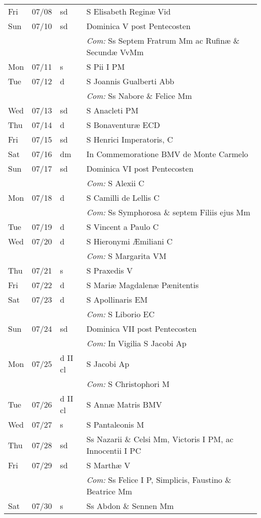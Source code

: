 \documentclass[10pt]{article}
\begin{document}
\begin{longtable}{ l l l l }
Fri & 07/08 & sd & S Elisabeth Reginæ Vid\\
Sun & 07/10 & sd & Dominica V post Pentecosten\\
 & & & \textit{Com:} Ss Septem Fratrum Mm ac Rufinæ \& Secundæ VvMm\\
Mon & 07/11 & s & S Pii I PM\\
Tue & 07/12 & d & S Joannis Gualberti Abb\\
 & & & \textit{Com:} Ss Nabore \& Felice Mm\\
Wed & 07/13 & sd & S Anacleti PM\\
Thu & 07/14 & d & S Bonaventuræ ECD\\
Fri & 07/15 & sd & S Henrici Imperatoris, C\\
Sat & 07/16 & dm & In Commemoratione BMV de Monte Carmelo\\
Sun & 07/17 & sd & Dominica VI post Pentecosten\\
 & & & \textit{Com:} S Alexii C\\
Mon & 07/18 & d & S Camilli de Lellis C\\
 & & & \textit{Com:} Ss Symphorosa \& septem Filiis ejus Mm\\
Tue & 07/19 & d & S Vincent a Paulo C\\
Wed & 07/20 & d & S Hieronymi Æmiliani C\\
 & & & \textit{Com:} S Margarita VM\\
Thu & 07/21 & s & S Praxedis V\\
Fri & 07/22 & d & S Mariæ Magdalenæ Pænitentis\\
Sat & 07/23 & d & S Apollinaris EM\\
 & & & \textit{Com:} S Liborio EC\\
Sun & 07/24 & sd & Dominica VII post Pentecosten\\
 & & & \textit{Com:} In Vigilia S Jacobi Ap\\
Mon & 07/25 & d II cl & S Jacobi Ap\\
 & & & \textit{Com:} S Christophori M\\
Tue & 07/26 & d II cl & S Annæ Matris BMV\\
Wed & 07/27 & s & S Pantaleonis M\\
Thu & 07/28 & sd & Ss Nazarii \& Celsi Mm, Victoris I PM, ac Innocentii I PC\\
Fri & 07/29 & sd & S Marthæ V\\
 & & & \textit{Com:} Ss Felice I P, Simplicis, Faustino \& Beatrice Mm\\
Sat & 07/30 & s & Ss Abdon \& Sennen Mm\\

\end{longtable}
\end{document}
